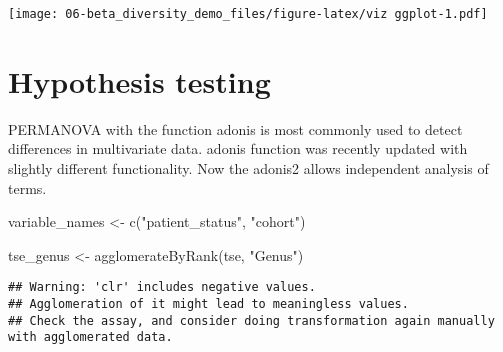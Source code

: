 \documentclass[
  oneside]{book}
\newenvironment{Shaded}{\begin{snugshade}}{\end{snugshade}}
\newcommand{\FunctionTok}[1]{\textcolor[rgb]{0.00,0.00,0.00}{#1}}
\newcommand{\NormalTok}[1]{#1}
\newcommand{\OtherTok}[1]{\textcolor[rgb]{0.56,0.35,0.01}{#1}}
\newcommand{\StringTok}[1]{\textcolor[rgb]{0.31,0.60,0.02}{#1}}
\begin{document}
\texttt{[image: 06-beta\_diversity\_demo\_files/figure-latex/viz ggplot-1.pdf]}

\hypertarget{hypothesis-testing}{%
\section{Hypothesis testing}\label{hypothesis-testing}}

PERMANOVA with the function adonis is most commonly used to detect differences in multivariate data.
adonis function was recently updated with slightly different functionality. Now the adonis2 allows independent analysis of terms.

\begin{Shaded}
\begin{Highlighting}[]
\NormalTok{variable\_names }\OtherTok{\textless{}{-}} \FunctionTok{c}\NormalTok{(}\StringTok{"patient\_status"}\NormalTok{, }\StringTok{"cohort"}\NormalTok{)}

\NormalTok{tse\_genus }\OtherTok{\textless{}{-}} \FunctionTok{agglomerateByRank}\NormalTok{(tse, }\StringTok{"Genus"}\NormalTok{)}
\end{Highlighting}
\end{Shaded}

\begin{verbatim}
## Warning: 'clr' includes negative values.
## Agglomeration of it might lead to meaningless values.
## Check the assay, and consider doing transformation again manually with agglomerated data.
\end{verbatim}
\end{document}
